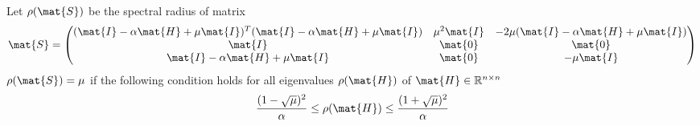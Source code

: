 \begin{lemma}
Let $\rho(\mat{S})$ be the spectral radius of matrix 
\begin{equation}
\mat{S} = {\begin{pmatrix}
(\mat{I}-\alpha \mat{H} + \mu \mat{I})^T(\mat{I}-\alpha \mat{H} + \mu \mat{I}) &  \mu^2 \mat{I} & -2\mu(\mat{I}-\alpha \mat{H} + \mu \mat{I})\\
\mat{I} & \mat{0} & \mat{0} \\
\mat{I}-\alpha \mat{H} + \mu \mat{I} & \mat{0} & - \mu \mat{I} 
\end{pmatrix}}
\end{equation}
$\rho(\mat{S})=\mu$ if the following condition holds for all eigenvalues $\rho(\mat{H})$ of $\mat{H}\in \mathbb{R}^{n \times n}$
\begin{equation}
{(1-\sqrt{\mu})^2\over \alpha} \leq \rho(\mat{H}) \leq {(1+\sqrt{\mu})^2\over \alpha}
\label{equ:control_condition_var}
\end{equation}


\end{lemma}
